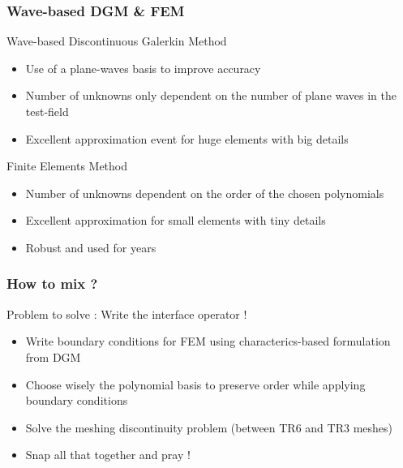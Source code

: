 \documentclass[10pt, compress]{beamer}
\begin{document}
\begin{frame}[fragile]
    \frametitle{Wave-based DGM \& FEM}

    \begin{block}{Wave-based Discontinuous Galerkin Method}
    \begin{itemize}
       \item Use of a \alert{plane-waves basis} to improve accuracy
       \item Number of unknowns only dependent on the \alert{number of plane waves} in the test-field
       \item Excellent approximation event for \alert{huge elements} with big details
    \end{itemize}
    \end{block}

    \begin{block}{Finite Elements Method}
    \begin{itemize}
       \item Number of unknowns dependent on the \alert{order of the chosen polynomials}
       \item Excellent approximation for small elements with \alert{tiny details}
       \item \alert{Robust} and used for years
    \end{itemize}
    \end{block}
\end{frame}

\begin{frame}
    \frametitle{How to mix ?}

    \begin{center}
        Problem to solve : \alert{Write the interface operator} !
    \end{center}

    \begin{itemize}
        \item Write boundary conditions for FEM using characterics-based formulation from DGM
        \item Choose wisely the polynomial basis to preserve order while applying boundary conditions
        \item Solve the meshing discontinuity problem (between TR6 and TR3 meshes)
        \item Snap all that together and pray !
    \end{itemize}
\end{frame}
\end{document}

